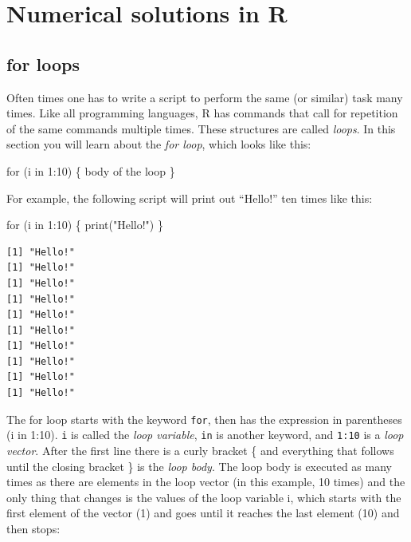 \documentclass[
  letterpaper,
  DIV=11,
  numbers=noendperiod]{scrreprt}
\newenvironment{Shaded}{\begin{snugshade}}{\end{snugshade}}
\newcommand{\ControlFlowTok}[1]{\textcolor[rgb]{0.00,0.23,0.31}{#1}}
\newcommand{\DecValTok}[1]{\textcolor[rgb]{0.68,0.00,0.00}{#1}}
\newcommand{\FunctionTok}[1]{\textcolor[rgb]{0.28,0.35,0.67}{#1}}
\newcommand{\NormalTok}[1]{\textcolor[rgb]{0.00,0.23,0.31}{#1}}
\newcommand{\SpecialCharTok}[1]{\textcolor[rgb]{0.37,0.37,0.37}{#1}}
\newcommand{\StringTok}[1]{\textcolor[rgb]{0.13,0.47,0.30}{#1}}
\begin{document}
\hypertarget{numerical-solutions-in-r}{%
\section{Numerical solutions in R}\label{numerical-solutions-in-r}}

\label{sec:comp14}

\hypertarget{for-loops}{%
\subsection{for loops}\label{for-loops}}

Often times one has to write a script to perform the same (or similar)
task many times. Like all programming languages, R has commands that
call for repetition of the same commands multiple times. These
structures are called \emph{loops}. In this section you will learn about
the  \emph{for loop}, which looks like
this:

\begin{Shaded}
\begin{Highlighting}[]
\ControlFlowTok{for}\NormalTok{ (i }\ControlFlowTok{in} \DecValTok{1}\SpecialCharTok{:}\DecValTok{10}\NormalTok{) \{}
\NormalTok{    body of the loop}
\NormalTok{\}}
\end{Highlighting}
\end{Shaded}

For example, the following script will print out ``Hello!'' ten times
like this:

\begin{Shaded}
\begin{Highlighting}[]
\ControlFlowTok{for}\NormalTok{ (i }\ControlFlowTok{in} \DecValTok{1}\SpecialCharTok{:}\DecValTok{10}\NormalTok{) \{}
    \FunctionTok{print}\NormalTok{(}\StringTok{"Hello!"}\NormalTok{)}
\NormalTok{\}}
\end{Highlighting}
\end{Shaded}

\begin{verbatim}
[1] "Hello!"
[1] "Hello!"
[1] "Hello!"
[1] "Hello!"
[1] "Hello!"
[1] "Hello!"
[1] "Hello!"
[1] "Hello!"
[1] "Hello!"
[1] "Hello!"
\end{verbatim}

The for loop starts with the keyword \texttt{for}, then has the
expression in parentheses (i in 1:10). \texttt{i} is called the
\emph{loop variable}, \texttt{in} is another keyword, and \texttt{1:10}
is a \emph{loop vector}. After the first line there is a curly bracket
\{ and everything that follows until the closing bracket \} is the
\emph{loop body}. The loop body is executed as many times as there are
elements in the loop vector (in this example, 10 times) and the only
thing that changes is the values of the loop variable i, which starts
with the first element of the vector (1) and goes until it reaches the
last element (10) and then stops:
\end{document}
